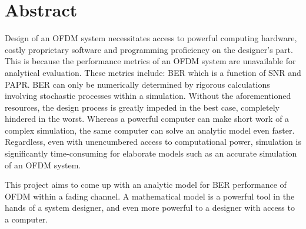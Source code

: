 \chapter*{Abstract}

Design of an \gls{OFDM} system necessitates access to powerful computing hardware, costly proprietary software and programming proficiency on the designer's part. This is because the performance metrics of an \gls{OFDM} system are unavailable for analytical evaluation. These metrics include: \gls{BER} which is a function of \gls{SNR} and \gls{PAPR}. \gls{BER} can only be numerically determined by rigorous calculations involving stochastic processes within a simulation. Without the aforementioned resources, the design process is greatly impeded in the best case, completely hindered in the worst. Whereas a powerful computer can make short work of a complex simulation, the same computer can solve an analytic model even faster. Regardless, even with unencumbered access to computational power, simulation is significantly time-consuming for elaborate models such as an accurate simulation of an \gls{OFDM} system.
 

This project aims to come up with an analytic model for \gls{BER} performance of \gls{OFDM}  within a fading channel. A mathematical model is a powerful tool in the hands of a system designer, and even more powerful to a designer with access to a computer.

